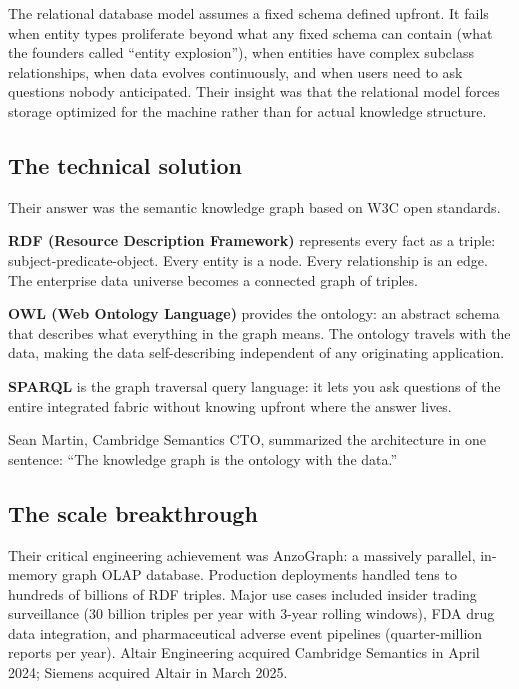 \documentclass[12pt]{article}
\begin{document}
The relational database model assumes a fixed schema defined upfront. It
fails when entity types proliferate beyond what any fixed schema can
contain (what the founders called ``entity explosion''), when entities
have complex subclass relationships, when data evolves continuously, and
when users need to ask questions nobody anticipated. Their insight was
that the relational model forces storage optimized for the machine
rather than for actual knowledge structure.

\subsection{The technical solution}\label{the-technical-solution}

Their answer was the semantic knowledge graph based on W3C open
standards.

\textbf{RDF (Resource Description Framework)} represents every fact as a
triple: subject-predicate-object. Every entity is a node. Every
relationship is an edge. The enterprise data universe becomes a
connected graph of triples.

\textbf{OWL (Web Ontology Language)} provides the ontology: an abstract
schema that describes what everything in the graph means. The ontology
travels with the data, making the data self-describing independent of
any originating application.

\textbf{SPARQL} is the graph traversal query language: it lets you ask
questions of the entire integrated fabric without knowing upfront where
the answer lives.

Sean Martin, Cambridge Semantics CTO, summarized the architecture in one
sentence: ``The knowledge graph is the ontology with the data.''

\subsection{The scale breakthrough}\label{the-scale-breakthrough}

Their critical engineering achievement was AnzoGraph: a massively
parallel, in-memory graph OLAP database. Production deployments handled
tens to hundreds of billions of RDF triples. Major use cases included
insider trading surveillance (30 billion triples per year with 3-year
rolling windows), FDA drug data integration, and pharmaceutical adverse
event pipelines (quarter-million reports per year). Altair Engineering
acquired Cambridge Semantics in April 2024; Siemens acquired Altair in
March 2025.
\end{document}
